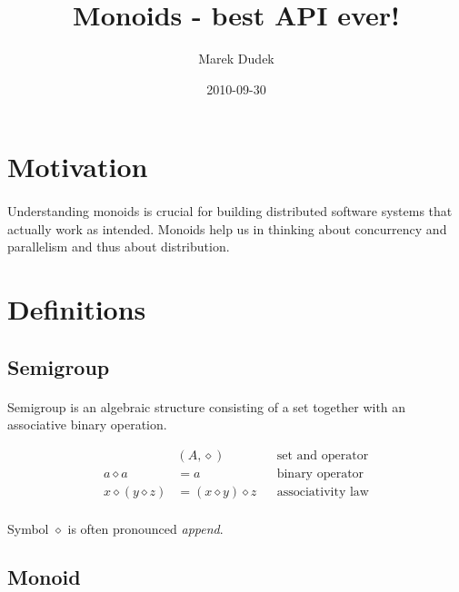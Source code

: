 \documentclass{article}
\title{Monoids - best API ever!}
\date{2010-09-30}
\author{Marek Dudek}
\begin{document}
\maketitle

\newpage
\tableofcontents

\newpage
{}

\section{Motivation}

    \paragraph{}
    Understanding monoids is crucial for building distributed software systems that actually work as intended. 
    Monoids help us in thinking about concurrency and parallelism and thus about distribution.

\section{Definitions}

\subsection{Semigroup}

    \paragraph{}
    Semigroup is an algebraic structure consisting of a set together with an associative binary operation.

    \begin{align*}
        &(A, \diamond) && \text{set and operator} \\
        a \diamond a &= a && \text{binary operator} \\
        x \diamond (y \diamond z) &= (x \diamond y) \diamond z && \text{associativity law}
    \end{align*}

    \paragraph{}
    Symbol $\diamond$ is often pronounced \textit{append}.

\subsection{Monoid}
\end{document}
